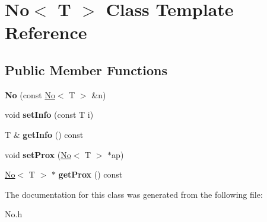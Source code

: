 \hypertarget{class_no}{\section{No$<$ T $>$ Class Template Reference}
\label{class_no}
}
\subsection*{Public Member Functions}
\begin{DoxyCompactItemize}
\item 
\hypertarget{class_no_a420a83430b639128927ec1461096d8ce}{{\bfseries No} (const \hyperlink{class_no}{No}$<$ T $>$ \&n)}\label{class_no_a420a83430b639128927ec1461096d8ce}

\item 
\hypertarget{class_no_a470e21f6852bd6e69b4601490b735407}{void {\bfseries set\-Info} (const T i)}\label{class_no_a470e21f6852bd6e69b4601490b735407}

\item 
\hypertarget{class_no_ad24a5b5b6d7140e190fcf407bef9ac80}{T \& {\bfseries get\-Info} () const }\label{class_no_ad24a5b5b6d7140e190fcf407bef9ac80}

\item 
\hypertarget{class_no_a525bbdc8bfd8d5d7eaf8ef31a4d555d2}{void {\bfseries set\-Prox} (\hyperlink{class_no}{No}$<$ T $>$ $\ast$ap)}\label{class_no_a525bbdc8bfd8d5d7eaf8ef31a4d555d2}

\item 
\hypertarget{class_no_aeecd877c098e714cddfe28557141929f}{\hyperlink{class_no}{No}$<$ T $>$ $\ast$ {\bfseries get\-Prox} () const }\label{class_no_aeecd877c098e714cddfe28557141929f}

\end{DoxyCompactItemize}


The documentation for this class was generated from the following file\-:\begin{DoxyCompactItemize}
\item 
No.\-h\end{DoxyCompactItemize}
